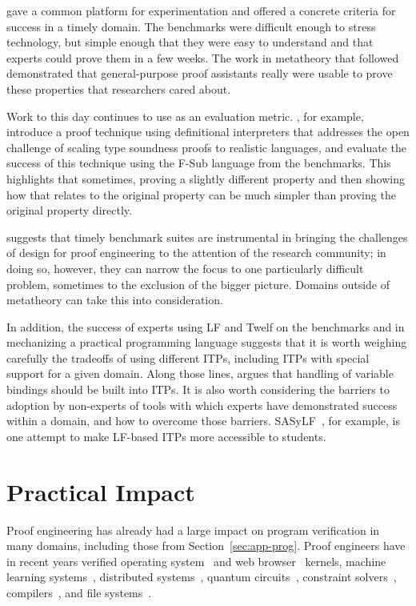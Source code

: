 \poplmark gave a common platform
for experimentation and offered a concrete criteria for success in a
timely domain.  The benchmarks were difficult enough to stress
technology, but simple enough that they were easy to understand and
that experts could prove them in a few weeks.
The work in metatheory that followed \poplmark demonstrated
that general-purpose proof assistants really were usable to prove these properties
that researchers cared about.

Work to this
day continues to use \poplmark as an evaluation metric. 
\cite{Amin2017}, for example, introduce a
proof technique using definitional interpreters that addresses the
open challenge of scaling type soundness proofs to realistic
languages, and evaluate the success of
this technique using the F-Sub language from the \poplmark
benchmarks. This highlights that sometimes, proving
a slightly different property and then showing how that relates to the
original property can be much simpler than proving the original
property directly.

\poplmark suggests that timely benchmark suites are instrumental in
bringing the challenges of design for proof engineering to the
attention of the research community; in doing so, however, they can
narrow the focus to one particularly difficult problem, sometimes to
the exclusion of the bigger picture. Domains outside of metatheory
can take this into consideration.

In addition, the success of experts using LF and Twelf on the \poplmark benchmarks and in mechanizing a practical programming language
suggests that it is worth weighing carefully the tradeoffs of using different ITPs, including ITPs with
special support for a given domain. Along those lines, \cite{Miller2018} argues
that handling of variable bindings should be built into ITPs. 
It is also worth considering the barriers to adoption by non-experts of tools with which experts
have demonstrated success within a domain, and how to overcome those barriers. 
SASyLF~\citep{Aldrich2008}, for example, is one attempt to make LF-based ITPs
more accessible to students.

\section{Practical Impact}
\label{sec:empirical}

Proof engineering has already had a large impact on program verification in many domains,
including those from Section~\ref{sec:app-prog}.
Proof engineers have in recent years verified
operating system~\citep{Klein2009} and web browser~\citep{Jang2012} kernels,
machine learning systems~\citep{DBLP:journals/corr/SelsamLD17},
distributed systems~\citep{Woos2016},
quantum circuits~\citep{rand2017},
constraint solvers~\citep{blanchette2018verified, schlichtkrull2019verified},
compilers~\citep{Leroy:POPL06, Kumar2014},
and file systems~\citep{Chen2015, Amani16}.

